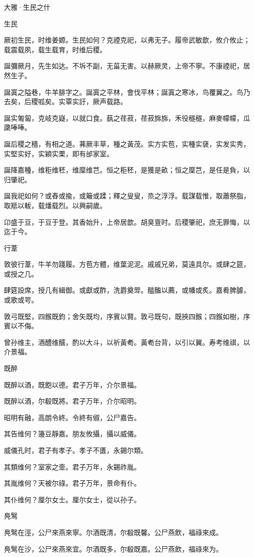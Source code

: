 大雅·生民之什


生民

厥初生民，时维姜嫄。生民如何？克禋克祀，以弗无子。履帝武敏歆，攸介攸止；载震载夙，载生载育，时维后稷。

誕彌厥月，先生如达。不坼不副，无菑无害。以赫厥灵，上帝不寧。不康禋祀，居然生子。

誕寘之隘巷，牛羊腓字之。誕寘之平林，會伐平林；誕寘之寒冰，鸟覆翼之。鸟乃去矣，后稷呱矣。实覃实訏，厥声载路。

誕实匍匐，克岐克嶷，以就口食。蓺之荏菽，荏菽旆旆，禾役穟穟，麻麥幪幪，瓜瓞唪唪。

誕后稷之穡，有相之道。茀厥丰草，種之黃茂。实方实苞，实種实褎，实发实秀，实堅实好，实穎实栗，即有邰家室。

誕降嘉種，维秬维秠，维穈维芑。恒之秬秠，是獲是畝；恒之穈芑，是任是負，以归肇祀。

誕我祀如何？或舂或揄，或簸或蹂；釋之叟叟，烝之浮浮。载謀载惟，取蕭祭脂，取羝以軷，载燔载烈。以興嗣歲。

卬盛于豆，于豆于登。其香始升，上帝居歆。胡臭亶时。后稷肇祀，庶无罪悔，以迄于今。

行葦

敦彼行葦，牛羊勿踐履。方苞方體，维葉泥泥。戚戚兄弟，莫遠具尔。或肆之筵，或授之几。

肆筵設席，授几有緝御。或獻或酢，洗爵奠斝。醓醢以薦，或幡或炙。嘉肴脾臄，或歌或咢。

敦弓既堅，四鍭既鈞；舍矢既均，序賓以賢。敦弓既句，既挾四鍭；四鍭如樹，序賓以不侮。

曾孙维主，酒醴维醹，酌以大斗，以祈黃耇。黃耇台背，以引以翼。寿考维祺，以介景福。

既醉

既醉以酒，既飽以德。君子万年，介尔景福。

既醉以酒，尔殽既將。君子万年，介尔昭明。

昭明有融，高朗令終。令終有俶，公尸嘉告。

其告维何？籩豆靜嘉。朋友攸攝，攝以威儀。

威儀孔时，君子有孝子。孝子不匱，永錫尔類。

其類维何？室家之壸。君子万年，永錫祚胤。

其胤维何？天被尔祿。君子万年，景命有仆。

其仆维何？厘尔女士。厘尔女士，從以孙子。

鳧鹥

鳧鹥在涇，公尸來燕來寧。尔酒既清，尔殽既馨。公尸燕飲，福祿來成。

鳧鹥在沙，公尸來燕來宜。尔酒既多，尔殽既嘉。公尸燕飲，福祿來为。

